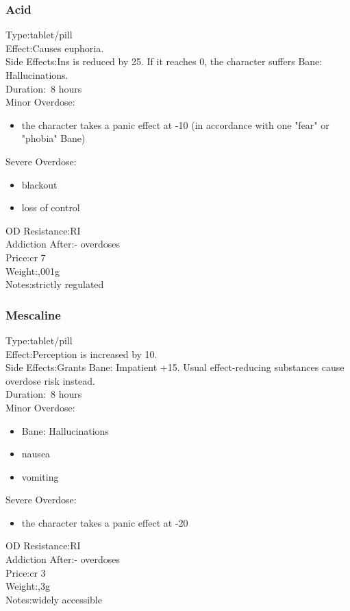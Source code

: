 \subsubsection{Acid}
Type:\tab tablet/pill\\
Effect:\tab Causes euphoria.\\
Side Effects:\tab Ins is reduced by 25. If it reaches 0, the character suffers Bane: Hallucinations.\\
Duration:\tab ~8 hours\\
Minor Overdose:\\
\begin{itemize}
	\setlength\itemsep{-8mm}
	\vspace{-12mm}
	\item the character takes a panic effect at -10 (in accordance with one "fear" or "phobia" Bane)
\end{itemize}
Severe Overdose:\\
\begin{itemize}
	\setlength\itemsep{-8mm}
	\vspace{-12mm}
	\item blackout
	\item loss of control
\end{itemize}
OD Resistance:\tab RI\\
Addiction After:\tab - overdoses\\
Price:\tab cr 7\\
Weight:,001g\\
Notes:\tab strictly regulated


\subsubsection{Mescaline}
Type:\tab tablet/pill\\
Effect:\tab Perception is increased by 10.\\
Side Effects:\tab Grants Bane: Impatient +15. Usual effect-reducing substances cause overdose risk instead.\\
Duration:\tab ~8 hours\\
Minor Overdose:\\
\begin{itemize}
	\setlength\itemsep{-8mm}
	\vspace{-12mm}
	\item Bane: Hallucinations
	\item nausea
	\item vomiting
\end{itemize}
Severe Overdose:\\
\begin{itemize}
	\setlength\itemsep{-8mm}
	\vspace{-12mm}
	\item the character takes a panic effect at -20
\end{itemize}
OD Resistance:\tab RI\\
Addiction After:\tab - overdoses\\
Price:\tab cr 3\\
Weight:,3g\\
Notes:\tab widely accessible


